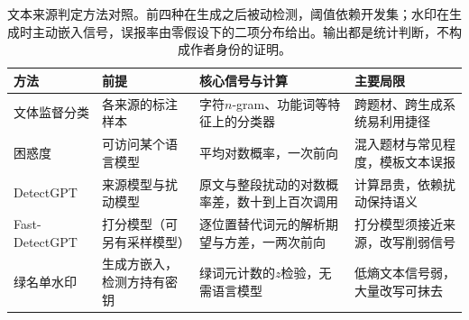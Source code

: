 \begin{table}[htbp]
  \centering
  \small
  \begin{tabularx}{\linewidth}{@{}>{\raggedright\arraybackslash}p{24mm}
    >{\raggedright\arraybackslash}X>{\raggedright\arraybackslash}X
    >{\raggedright\arraybackslash}X@{}}
    \toprule
    方法 & 前提 & 核心信号与计算 & 主要局限 \\
    \midrule
    文体监督分类 & 各来源的标注样本 & 字符$n$-gram、功能词等特征上的分类器 & 跨题材、跨生成系统易利用捷径 \\
    困惑度 & 可访问某个语言模型 & 平均对数概率，一次前向 & 混入题材与常见程度，模板文本误报 \\
    DetectGPT & 来源模型与扰动模型 & 原文与整段扰动的对数概率差，数十到上百次调用 & 计算昂贵，依赖扰动保持语义 \\
    Fast-DetectGPT & 打分模型（可另有采样模型） & 逐位置替代词元的解析期望与方差，一两次前向 & 打分模型须接近来源，改写削弱信号 \\
    绿名单水印 & 生成方嵌入，检测方持有密钥 & 绿词元计数的$z$检验，无需语言模型 & 低熵文本信号弱，大量改写可抹去 \\
    \bottomrule
  \end{tabularx}
  \caption{文本来源判定方法对照。前四种在生成之后被动检测，阈值依赖开发集；水印在生成时主动嵌入信号，误报率由零假设下的二项分布给出。输出都是统计判断，不构成作者身份的证明。}
  \label{tab:nlp-classification-origin-methods}
\end{table}
